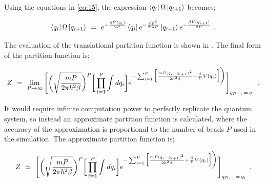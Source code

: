\documentclass{ece}
\begin{document}
Using the equations in \ref{eq:15}, the expression \begin{math} \bra{q_i} \Omega \ket{q_{i+1}} \end{math} becomes;

\begin{equation} \label{eq:17}
\bra{q_i} \Omega \ket{q_{i+1}} \hspace{0.125cm} = \hspace{0.125cm}  e^{-\frac{\beta \hat{V}(q_i)}{2 P}} \bra{q_i} e^{- \frac{\beta \hat{p}^2}{2 m P}} \ket{q_{i+1}} e^{-\frac{\beta \hat{V}(q_{i+1})}{2 P}}  \hspace{0.125cm} .
\end{equation}

The evaluation of the translational partition function is shown in . The final form of the partition function is; 

\begin{equation} \label{eq:29}
Z \hspace{0.125cm} = \hspace{0.125cm} \lim_{P \rightarrow \infty} \Bigg[ \bigg(\sqrt{\frac{m P}{2 \pi \hbar^2 \beta}}\bigg)^{P} \bigg[ \prod_{i=1}^{P} \int d q_i \bigg] e^{- \sum_{i = 1}^{P} \Big[ \frac{ m P (q_i - q_{i+1})^2}{2 \hbar^2 \beta} + \frac{\beta}{P} V(q_i) \Big] \bigg)} \Bigg]_{q_{P + 1} \hspace{0.05cm} = \hspace{0.05cm} q_1} \hspace{0.125cm} .
\end{equation}

It would require infinite computation power to perfectly replicate the quantum system, so instead an approximate partition function is calculated, where the accuracy of the approximation is proportional to the number of beads \begin{math} P \end{math} used in the simulation. The approximate partition function is;

\begin{equation} \label{eq:29}
Z \hspace{0.125cm} \simeq \hspace{0.125cm} \Bigg[ \bigg(\sqrt{\frac{m P}{2 \pi \hbar^2 \beta}}\bigg)^{P} \bigg[ \prod_{i=1}^{P} \int d q_i \bigg] e^{- \sum_{i = 1}^{P} \Big[ \frac{ m P (q_i - q_{i+1})^2}{2 \hbar^2 \beta} + \frac{\beta}{P} V(q_i) \Big] \bigg)} \Bigg]_{q_{P + 1} \hspace{0.05cm} = \hspace{0.05cm} q_1} \hspace{0.125cm} .
\end{equation}
\end{document}
